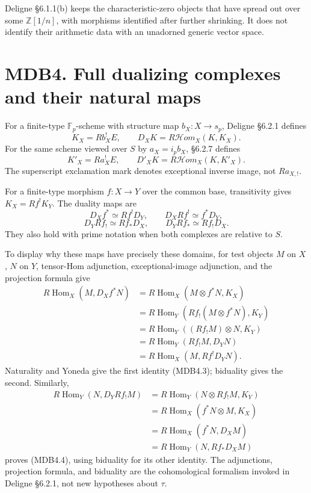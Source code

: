 \documentclass[
]{report}
\begin{document}
Deligne §6.1.1(b) keeps the characteristic-zero objects that have spread
out over some \(\mathbb Z[1/n]\), with morphisms identified after
further shrinking. It does not identify their arithmetic data with an
unadorned generic vector space.

\section{MDB4. Full dualizing complexes and their natural
maps}\label{mdb4.-full-dualizing-complexes-and-their-natural-maps}

For a finite-type \(\mathbb F_p\)-scheme with structure map
\(b_X:X\to s_p\), Deligne §6.2.1 defines \[
K_X=Rb_X^!E,\qquad D_XK=R\mathcal Hom_X(K,K_X).
\tag{MDB4.1}
\] For the same scheme viewed over \(S\) by \(a_X=i_pb_X\), §6.2.7
defines \[
K'_X=Ra_X^!E,\qquad D'_XK=R\mathcal Hom_X(K,K'_X).
\tag{MDB4.2}
\] The superscript exclamation mark denotes exceptional inverse image,
not \(Ra_{X,!}\).

For a finite-type morphism \(f:X\to Y\) over the common base,
transitivity gives \(K_X=Rf^!K_Y\). The duality maps are \[
D_Xf^*\simeq Rf^!D_Y,\qquad D_XRf^!\simeq f^*D_Y,
\tag{MDB4.3}
\] \[
D_YRf_!\simeq Rf_*D_X,\qquad D_YRf_*\simeq Rf_!D_X.
\tag{MDB4.4}
\] They also hold with prime notation when both complexes are relative
to \(S\).

To display why these maps have precisely these domains, for test objects
\(M\) on \(X\), \(N\) on \(Y\), tensor-Hom adjunction, exceptional-image
adjunction, and the projection formula give \[
\begin{aligned}
R\operatorname{Hom}_X(M,D_Xf^*N)
&=R\operatorname{Hom}_X(M\otimes f^*N,K_X)\\
&=R\operatorname{Hom}_Y(Rf_!(M\otimes f^*N),K_Y)\\
&=R\operatorname{Hom}_Y((Rf_!M)\otimes N,K_Y)\\
&=R\operatorname{Hom}_Y(Rf_!M,D_YN)\\
&=R\operatorname{Hom}_X(M,Rf^!D_YN).
\end{aligned}
\tag{MDB4.5}
\] Naturality and Yoneda give the first identity (MDB4.3); biduality
gives the second. Similarly, \[
\begin{aligned}
R\operatorname{Hom}_Y(N,D_YRf_!M)
&=R\operatorname{Hom}_Y(N\otimes Rf_!M,K_Y)\\
&=R\operatorname{Hom}_X(f^*N\otimes M,K_X)\\
&=R\operatorname{Hom}_X(f^*N,D_XM)\\
&=R\operatorname{Hom}_Y(N,Rf_*D_XM)
\end{aligned}
\tag{MDB4.6}
\] proves (MDB4.4), using biduality for its other identity. The
adjunctions, projection formula, and biduality are the cohomological
formalism invoked in Deligne §6.2.1, not new hypotheses about \(\tau\).
\end{document}
